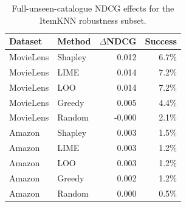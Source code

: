 \begin{table}[t]\centering\small
\caption{Full-unseen-catalogue NDCG effects for the ItemKNN robustness subset.}
\label{tab:appC3}
\begin{tabular}{llrr}
\toprule
Dataset & Method & $\Delta$NDCG & Success \\
\midrule
MovieLens & Shapley & 0.012 & 6.7\% \\
MovieLens & LIME & 0.014 & 7.2\% \\
MovieLens & LOO & 0.014 & 7.2\% \\
MovieLens & Greedy & 0.005 & 4.4\% \\
MovieLens & Random & -0.000 & 2.1\% \\
\midrule
Amazon & Shapley & 0.003 & 1.5\% \\
Amazon & LIME & 0.003 & 1.2\% \\
Amazon & LOO & 0.003 & 1.2\% \\
Amazon & Greedy & 0.002 & 1.2\% \\
Amazon & Random & 0.000 & 0.5\% \\
\bottomrule
\end{tabular}
\end{table}